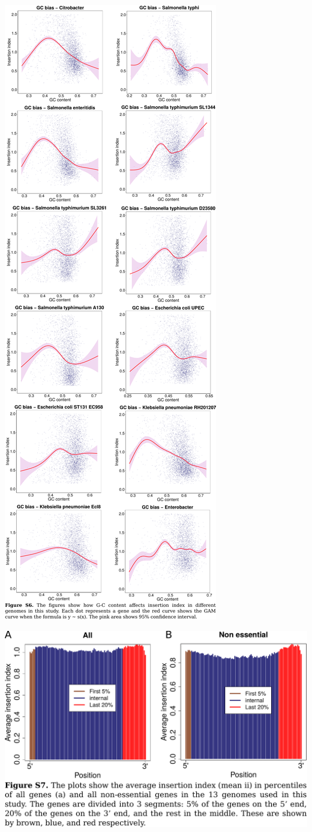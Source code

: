 \documentclass{article}
\newcommand{\Newpage}{\end{preview}\begin{preview}}
\begin{document}
\begin{preview}
\includegraphics{suppl6.pdf}
\Newpage
\includegraphics{suppl7.pdf}

\end{preview}
\end{document}

